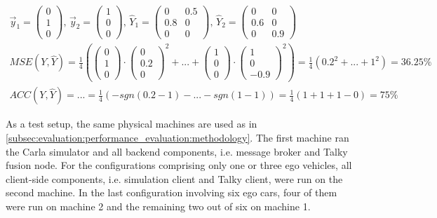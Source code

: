 \begin{gather*}
	\vec{y}_1 = \begin{pmatrix}0 \\ 1 \\ 0 \end{pmatrix} \text{,\ } \vec{y}_2 = \begin{pmatrix}1 \\ 0 \\ 0 \end{pmatrix} \text{,\ }
	\hat{Y}_1 = \begin{pmatrix}
	0 & 0.5 \\
	0.8 & 0 \\
	0 & 0
	\end{pmatrix} \text{,\ }
	\hat{Y}_2 = \begin{pmatrix}
	0 & 0 \\
	0.6 & 0 \\
	0 & 0.9
	\end{pmatrix} \\
	\textit{MSE}(Y, \hat{Y}) = \frac{1}{4} (\begin{pmatrix}0 \\ 1 \\ 0 \end{pmatrix} \cdot \begin{pmatrix}0 \\ 0.2 \\ 0 \end{pmatrix}^2 + \text{...} + \begin{pmatrix}1 \\ 0 \\ 0 \end{pmatrix} \cdot \begin{pmatrix}1 \\ 0 \\ -0.9 \end{pmatrix}^2) = \frac{1}{4} (0.2^2 + \text{...} + 1^2) = 36.25 \% \\
	\textit{ACC}(Y, \hat{Y}) = \text{...} = \frac{1}{4} (-\textit{sgn}(0.2-1) - \text{...} -\textit{sgn}(1-1)) = \frac{1}{4} (1+1+1-0) = 75 \%
\end{gather*}

As a test setup, the same physical machines are used as in \cref{subsec:evaluation:performance_evaluation:methodology}. The first machine ran the Carla simulator and all backend components, i.e. message broker and Talky fusion node. For the configurations comprising only one or three ego vehicles, all client-side components, i.e. simulation client and Talky client, were run on the second machine. In the last configuration involving six ego cars, four of them were run on machine 2 and the remaining two out of six on machine 1.